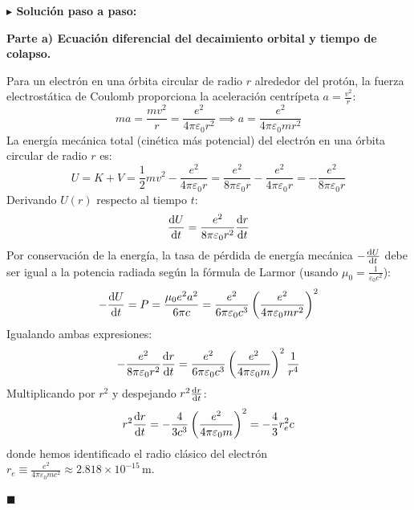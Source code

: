 \documentclass[11pt,a4paper]{book}
\newenvironment{solucion}{%
    \par\medskip\noindent\textbf{\color{blue!65!black}\Large $\blacktriangleright$ Solución paso a paso:}\par\medskip
}{%
    \hfill$\blacksquare$\par\bigskip
}
\begin{document}
\begin{solucion}
\textbf{Parte a) Ecuación diferencial del decaimiento orbital y tiempo de colapso.}

Para un electrón en una órbita circular de radio $r$ alrededor del protón, la fuerza electrostática de Coulomb proporciona la aceleración centrípeta $a = \frac{v^2}{r}$:
\begin{equation}
    m a = \frac{m v^2}{r} = \frac{e^2}{4\pi\varepsilon_0 r^2} \implies a = \frac{e^2}{4\pi\varepsilon_0 m r^2}
\end{equation}
La energía mecánica total (cinética más potencial) del electrón en una órbita circular de radio $r$ es:
\begin{equation}
    U = K + V = \frac{1}{2}mv^2 - \frac{e^2}{4\pi\varepsilon_0 r} = \frac{e^2}{8\pi\varepsilon_0 r} - \frac{e^2}{4\pi\varepsilon_0 r} = -\frac{e^2}{8\pi\varepsilon_0 r}
\end{equation}
Derivando $U(r)$ respecto al tiempo $t$:
\begin{equation}
    \dv{U}{t} = \frac{e^2}{8\pi\varepsilon_0 r^2} \dv{r}{t}
\end{equation}
Por conservación de la energía, la tasa de pérdida de energía mecánica $-\dv{U}{t}$ debe ser igual a la potencia radiada según la fórmula de Larmor (usando $\mu_0 = \frac{1}{\varepsilon_0 c^2}$):
\begin{equation}
    -\dv{U}{t} = P = \frac{\mu_0 e^2 a^2}{6\pi c} = \frac{e^2}{6\pi\varepsilon_0 c^3} \left(\frac{e^2}{4\pi\varepsilon_0 m r^2}\right)^2
\end{equation}
Igualando ambas expresiones:
\begin{equation}
    -\frac{e^2}{8\pi\varepsilon_0 r^2} \dv{r}{t} = \frac{e^2}{6\pi\varepsilon_0 c^3} \left(\frac{e^2}{4\pi\varepsilon_0 m}\right)^2 \frac{1}{r^4}
\end{equation}
Multiplicando por $r^2$ y despejando $r^2 \dv{r}{t}$:
\begin{equation}
    r^2 \dv{r}{t} = -\frac{4}{3 c^3}\left(\frac{e^2}{4\pi\varepsilon_0 m}\right)^2 = -\frac{4}{3} r_e^2 c
\end{equation}
donde hemos identificado el radio clásico del electrón $r_e \equiv \frac{e^2}{4\pi\varepsilon_0 m c^2} \approx 2.818 \times 10^{-15}\,\text{m}$.


\end{solucion}
\end{document}

